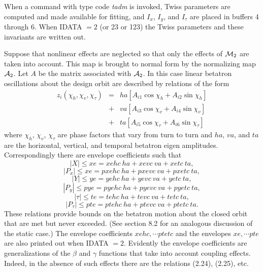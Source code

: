 When a command with type code {\em tadm} is invoked, Twiss parameters are computed and made available for fitting, and $I_x$, $I_y$, and $I_{\tau}$ are placed in buffers 4 through 6.  When IDATA $= 2$ (or 23 or 123) the Twiss parameters and these invariants are written out.

Suppose that nonlinear effects are neglected so that only the effects of ${\cal M}_2$ are taken into account.  This map is brought to normal form by the normalizing map ${\cal A}_2$.  Let $A$ be the matrix associated with ${\cal A}_2$.  In this case linear betatron oscillations about the design orbit are described by relations of the form
\begin{eqnarray}
z_i(\chi_h,\chi_v,\chi_{\tau}) &=& ha [A_{i1} \cos \chi_h + A_{i2} \sin \chi_h] \nonumber \\
&+& va [A_{i3} \cos \chi_v + A_{i4} \sin \chi_v] \nonumber \\
&+& ta [A_{i5} \cos \chi_{\tau} + A_{i6} \sin \chi_{\tau}]
\end{eqnarray}
where $\chi_h$, $\chi_v$, $\chi_{\tau}$ are phase factors that vary from turn to turn and $ha$, $va$, and $ta$ are the horizontal, vertical, and temporal betatron eigen amplitudes.  Correspondingly there are envelope coefficients such that 
\begin{equation}
|X| \leq xe = xehc \ ha + xevc \ va + xetc \ ta ,
\end{equation}
\begin{equation}
|P_x| \leq xe = pxehc \ ha + pxevc \ va + pxetc \ ta ,
\end{equation}
\begin{equation}
|Y| \leq ye = yehc \ ha + yevc \ va  + yetc \ ta ,
\end{equation}
\begin{equation}
|P_y| \leq pye = pyehc \ ha + pyevc \ va + pyetc \ ta ,
\end{equation}
\begin{equation}
|\tau | \leq te = tehc \ ha + tevc \ va + tetc \ ta ,
\end{equation}
\begin{equation}
|P_{\tau}| \leq pte = ptehc \ ha + ptevc \ va + ptetc \ ta .
\end{equation}
These relations provide bounds on the betatron motion about the closed orbit that are met but never exceeded.  (See section 8.2 for an analogous discussion of the static case.)  The envelope coefficients $xehc, \cdots ptetc$ and the envelopes $xe, \cdots pte$ are also printed out when IDATA $= 2$.  Evidently the envelope coefficients are generalizations of the $\beta$ and $\gamma$ functions that take into account coupling effects.  Indeed, in the absence of such effects there are the relations (2.24), (2.25), etc.

